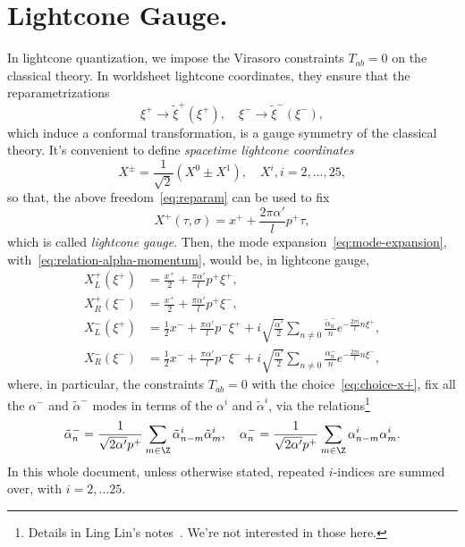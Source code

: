\section{Lightcone Gauge.}
In lightcone quantization, we impose the Virasoro constraints $T_{ab}=0$ on the classical theory. In worldsheet lightcone coordinates, they ensure that the reparametrizations
\begin{equation}\label{eq:reparam}
    \xi^+ \to \tilde{\xi}^+(\xi^+), \quad \xi^- \to \tilde{\xi}^-(\xi^-),
\end{equation}
which induce a conformal transformation, is a gauge symmetry of the classical theory. It's convenient to define \emph{spacetime lightcone coordinates}
\begin{equation}
    X^\pm = \frac{1}{\sqrt{2}}(X^0 \pm X^1), \quad X^i, i = 2, \dots, 25,
\end{equation}
so that, the above freedom~\eqref{eq:reparam} can be used to fix
\begin{equation}\label{eq:choice-x+}
    X^+(\tau,\sigma) = x^+ + \frac{2\pi\alpha'}{l}p^+ \tau ,
\end{equation}
which is called \emph{lightcone gauge}. Then, the mode expansion~\eqref{eq:mode-expansion}, with~\eqref{eq:relation-alpha-momentum}, would be, in lightcone gauge,
\begin{subequations}
\begin{align}
    X^+_L(\xi^+) &= \frac{x^+}{2} + \frac{\pi\alpha'}{l}p^+ \xi^+, \\
    X^+_R(\xi^-) &= \frac{x^+}{2} + \frac{\pi\alpha'}{l}p^+ \xi^-, \\
    X^-_L(\xi^+) &= \frac{1}{2} x^- + \frac{\pi\alpha'}{l} p^- \xi^+ + i \sqrt{\frac{\alpha'}{2}} \sum_{n\neq 0}\frac{\tilde{\alpha}^-_n}{n} e^{-\frac{2\pi i}{l}n \xi^+}, \\
    X^-_R(\xi^-) &=\frac{1}{2} x^- + \frac{\pi\alpha'}{l} p^- \xi^- + i \sqrt{\frac{\alpha'}{2}} \sum_{n\neq 0}\frac{{\alpha}^-_n}{n} e^{-\frac{2\pi i}{l}n \xi^-},
\end{align}
\end{subequations}
where, in particular, the constraints $T_{ab}=0$ with the choice~\eqref{eq:choice-x+}, fix all the $\alpha^-$ and $\tilde{\alpha}^-$ modes in terms of the $\alpha^i$ and $\tilde{\alpha}^i$, via the relations\footnote{Details in Ling Lin's notes~\cite{ling:strings}. We're not interested in those here.}
\begin{equation}\label{eq:relation-alpha--}
    \tilde{\alpha}^-_n = \frac{1}{\sqrt{2\alpha'}p^+} \sum_{m \in \Z} \tilde{\alpha}^i_{n-m} \tilde{\alpha}^i_m, \quad {\alpha}^-_n = \frac{1}{\sqrt{2\alpha'}p^+} \sum_{m \in \Z} {\alpha}^i_{n-m} {\alpha}^i_m .
\end{equation}
In this whole document, unless otherwise stated, repeated $i$-indices are summed over, with $i=2, \dots 25$.

